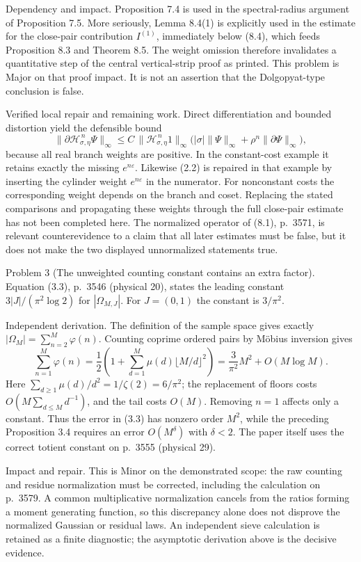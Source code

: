 \documentclass[10pt]{article}
\begin{document}
Dependency and impact. Proposition 7.4 is used in the spectral-radius argument of Proposition 7.5. More seriously, Lemma 8.4(1) is explicitly used in the estimate for the close-pair contribution \(I^{(1)}\), immediately below (8.4), which feeds Proposition 8.3 and Theorem 8.5. The weight omission therefore invalidates a quantitative step of the central vertical-strip proof as printed. This problem is Major on that proof impact. It is not an assertion that the Dolgopyat-type conclusion is false.\par
Verified local repair and remaining work. Direct differentiation and bounded distortion yield the defensible bound \[\|\partial\mathcal H_{\sigma,\eta}^{\,n}\Psi\|_\infty
 \le C\,\|\mathcal H_{\sigma,\eta}^{\,n}1\|_\infty
 \bigl(|\sigma|\|\Psi\|_\infty+
              \rho^n\|\partial\Psi\|_\infty\bigr),
 \tag{2.3}\] because all real branch weights are positive. In the constant-cost example it retains exactly the missing \(e^{n\varepsilon}\). Likewise (2.2) is repaired in that example by inserting the cylinder weight \(e^{n\varepsilon}\) in the numerator. For nonconstant costs the corresponding weight depends on the branch and coset. Replacing the stated comparisons and propagating these weights through the full close-pair estimate has not been completed here. The normalized operator of (8.1), p. 3571, is relevant counterevidence to a claim that all later estimates must be false, but it does not make the two displayed unnormalized statements true.\par
Problem 3 (The unweighted counting constant contains an extra factor).  Equation (3.3), p. 3546 (physical 20), states the leading constant \(3|J|/(\pi^2\log2)\) for \(|\Omega_{M,J}|\). For \(J=(0,1)\) the constant is \(3/\pi^2\).\par
Independent derivation. The definition of the sample space gives exactly \(|\Omega_M|=\sum_{n=2}^M\varphi(n)\). Counting coprime ordered pairs by Möbius inversion gives \[\sum_{n=1}^M\varphi(n)
 =\frac12\left(1+\sum_{d=1}^M
               \mu(d)\lfloor M/d\rfloor^2\right)
 =\frac{3}{\pi^2}M^2+O(M\log M).\] Here \(\sum_{d\ge1}\mu(d)/d^2=1/\zeta(2)=6/\pi^2\); the replacement of floors costs \(O(M\sum_{d\le M}d^{-1})\), and the tail costs \(O(M)\). Removing \(n=1\) affects only a constant. Thus the error in (3.3) has nonzero order \(M^2\), while the preceding Proposition 3.4 requires an error \(O(M^\delta)\) with \(\delta<2\). The paper itself uses the correct totient constant on p. 3555 (physical 29).\par
Impact and repair. This is Minor on the demonstrated scope: the raw counting and residue normalization must be corrected, including the calculation on p. 3579. A common multiplicative normalization cancels from the ratios forming a moment generating function, so this discrepancy alone does not disprove the normalized Gaussian or residual laws. An independent sieve calculation is retained as a finite diagnostic; the asymptotic derivation above is the decisive evidence.\par
\end{document}
